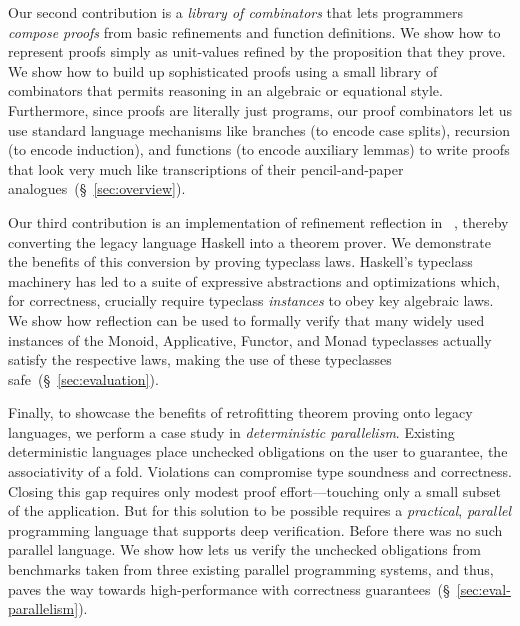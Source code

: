 %
Our second contribution is a
\emph{library of combinators}
that lets programmers
\emph{compose proofs}
from basic refinements
and function definitions.
%
We show how to represent proofs
simply as unit-values refined
by the proposition that
they prove. %
%
We show how to build up sophisticated proofs
using a small library of combinators that
permits reasoning in an algebraic or
equational style.
%
Furthermore, since proofs are literally
just programs, our proof combinators let
us use standard language mechanisms like
branches (to encode case splits),
recursion (to encode induction), and
functions (to encode auxiliary lemmas)
to write proofs that look very much like
transcriptions of their pencil-and-paper
analogues~(\S~\ref{sec:overview}).

%
Our third contribution is an implementation
of refinement reflection in \toolname~\citep{Vazou14},
thereby converting the legacy language
Haskell into a theorem prover.
%
We demonstrate the benefits of this conversion
by proving typeclass laws.
%
Haskell's typeclass machinery has led to
a suite of expressive abstractions and optimizations
which, for correctness, crucially require
typeclass \emph{instances} to obey key algebraic laws.
We show how reflection can be used to formally verify
that many widely used instances of the Monoid, Applicative,
Functor, and Monad typeclasses actually satisfy the
respective laws, making the use of these typeclasses safe~(\S~\ref{sec:evaluation}).

Finally, to showcase the benefits of retrofitting
theorem proving onto legacy languages, we perform
a case study in \emph{deterministic parallelism}.
%
%
Existing deterministic languages place unchecked
obligations on the user to guarantee, \eg the
associativity of a fold.
%
Violations can compromise type soundness
and correctness.
%
Closing this gap requires only modest proof
effort---touching only a small subset of
the application.
%
But for this solution to be possible requires a
\emph{practical}, \emph{parallel} programming
language that supports deep verification.
%
Before \toolname there was no such parallel language.
%
%
We show how \toolname lets us verify the unchecked obligations
from benchmarks taken from three existing parallel programming 
systems, and thus, paves the way towards 
high-performance with correctness guarantees~(\S~\ref{sec:eval-parallelism}).


